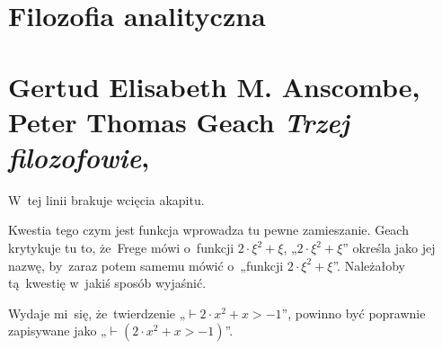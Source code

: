 \documentclass[a4paper,11pt]{article}
\numberwithin{equation}{section}
\begin{document}
\VerSpaceTwo













\newpage

\section{Filozofia analityczna}

\VerSpaceTwo



\section{Gertud Elisabeth M. Anscombe, Peter Thomas Geach
  \textit{Trzej filozofowie},
  \parencite{AnscombeGeachTrzejFilozofowie1981}}


\vspace{0em}



\vspace{0em}


\noindent
{} W~tej linii brakuje wcięcia akapitu.

\VerSpaceFour





\noindent
{} Kwestia tego czym jest funkcja wprowadza tu
pewne zamieszanie. Geach krytykuje tu to, że~Frege mówi o~funkcji
$2 \cdot \xi^{ 2 } + \xi$, „$2 \cdot \xi^{ 2 } + \xi$” określa jako
jej nazwę, by~zaraz potem samemu mówić o~„funkcji
$2 \cdot \xi^{ 2 } + \xi$”. Należałoby tą~kwestię w~jakiś sposób
wyjaśnić.

\VerSpaceFour





\noindent
{} Wydaje mi~się, że~twierdzenie „$\vdash 2 \cdot x^{ 2 } + x > -1$”, powinno
być poprawnie zapisywane jako „$\vdash( 2 \cdot x^{ 2 } + x > -1)$”.

\VerSpaceFour
\end{document}
